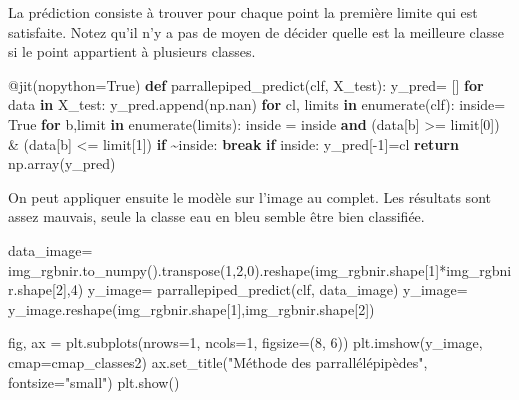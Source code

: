 \documentclass[
]{article}
\newenvironment{Shaded}{}{}
\newcommand{\AttributeTok}[1]{\textcolor[rgb]{0.49,0.56,0.16}{#1}}
\newcommand{\BuiltInTok}[1]{\textcolor[rgb]{0.00,0.50,0.00}{#1}}
\newcommand{\ControlFlowTok}[1]{\textcolor[rgb]{0.00,0.44,0.13}{\textbf{#1}}}
\newcommand{\DecValTok}[1]{\textcolor[rgb]{0.25,0.63,0.44}{#1}}
\newcommand{\KeywordTok}[1]{\textcolor[rgb]{0.00,0.44,0.13}{\textbf{#1}}}
\newcommand{\NormalTok}[1]{#1}
\newcommand{\OperatorTok}[1]{\textcolor[rgb]{0.40,0.40,0.40}{#1}}
\newcommand{\StringTok}[1]{\textcolor[rgb]{0.25,0.44,0.63}{#1}}
\newcommand{\VariableTok}[1]{\textcolor[rgb]{0.10,0.09,0.49}{#1}}
\begin{document}
La prédiction consiste à trouver pour chaque point la première limite
qui est satisfaite. Notez qu'il n'y a pas de moyen de décider quelle est
la meilleure classe si le point appartient à plusieurs classes.

\label{7fca7665}
\label{cb21}
\begin{Shaded}
\begin{Highlighting}[]
\AttributeTok{@jit}\NormalTok{(nopython}\OperatorTok{=}\VariableTok{True}\NormalTok{)}
\KeywordTok{def}\NormalTok{ parrallepiped\_predict(clf, X\_test):}
\NormalTok{  y\_pred}\OperatorTok{=}\NormalTok{ []}
  \ControlFlowTok{for}\NormalTok{ data }\KeywordTok{in}\NormalTok{ X\_test:}
\NormalTok{    y\_pred.append(np.nan)}
    \ControlFlowTok{for}\NormalTok{ cl, limits }\KeywordTok{in} \BuiltInTok{enumerate}\NormalTok{(clf):}
\NormalTok{      inside}\OperatorTok{=} \VariableTok{True}
      \ControlFlowTok{for}\NormalTok{ b,limit }\KeywordTok{in} \BuiltInTok{enumerate}\NormalTok{(limits):}
\NormalTok{        inside }\OperatorTok{=}\NormalTok{ inside }\KeywordTok{and}\NormalTok{ (data[b] }\OperatorTok{\textgreater{}=}\NormalTok{ limit[}\DecValTok{0}\NormalTok{]) }\OperatorTok{\&}\NormalTok{ (data[b] }\OperatorTok{\textless{}=}\NormalTok{ limit[}\DecValTok{1}\NormalTok{])}
        \ControlFlowTok{if} \OperatorTok{\textasciitilde{}}\NormalTok{inside:}
          \ControlFlowTok{break}
      \ControlFlowTok{if}\NormalTok{ inside:}
\NormalTok{        y\_pred[}\OperatorTok{{-}}\DecValTok{1}\NormalTok{]}\OperatorTok{=}\NormalTok{cl}
  \ControlFlowTok{return}\NormalTok{ np.array(y\_pred)}
\end{Highlighting}
\end{Shaded}

On peut appliquer ensuite le modèle sur l'image au complet. Les
résultats sont assez mauvais, seule la classe eau en bleu semble être
bien classifiée.

\label{abbef1d0}
\label{cb22}
\begin{Shaded}
\begin{Highlighting}[]
\NormalTok{data\_image}\OperatorTok{=}\NormalTok{ img\_rgbnir.to\_numpy().transpose(}\DecValTok{1}\NormalTok{,}\DecValTok{2}\NormalTok{,}\DecValTok{0}\NormalTok{).reshape(img\_rgbnir.shape[}\DecValTok{1}\NormalTok{]}\OperatorTok{*}\NormalTok{img\_rgbnir.shape[}\DecValTok{2}\NormalTok{],}\DecValTok{4}\NormalTok{)}
\NormalTok{y\_image}\OperatorTok{=}\NormalTok{ parrallepiped\_predict(clf, data\_image)}
\NormalTok{y\_image}\OperatorTok{=}\NormalTok{ y\_image.reshape(img\_rgbnir.shape[}\DecValTok{1}\NormalTok{],img\_rgbnir.shape[}\DecValTok{2}\NormalTok{])}

\NormalTok{fig, ax }\OperatorTok{=}\NormalTok{ plt.subplots(nrows}\OperatorTok{=}\DecValTok{1}\NormalTok{, ncols}\OperatorTok{=}\DecValTok{1}\NormalTok{, figsize}\OperatorTok{=}\NormalTok{(}\DecValTok{8}\NormalTok{, }\DecValTok{6}\NormalTok{))}
\NormalTok{plt.imshow(y\_image, cmap}\OperatorTok{=}\NormalTok{cmap\_classes2)}
\NormalTok{ax.set\_title(}\StringTok{"Méthode des parrallélépipèdes"}\NormalTok{, fontsize}\OperatorTok{=}\StringTok{"small"}\NormalTok{)}
\NormalTok{plt.show()}
\end{Highlighting}
\end{Shaded}
\end{document}
